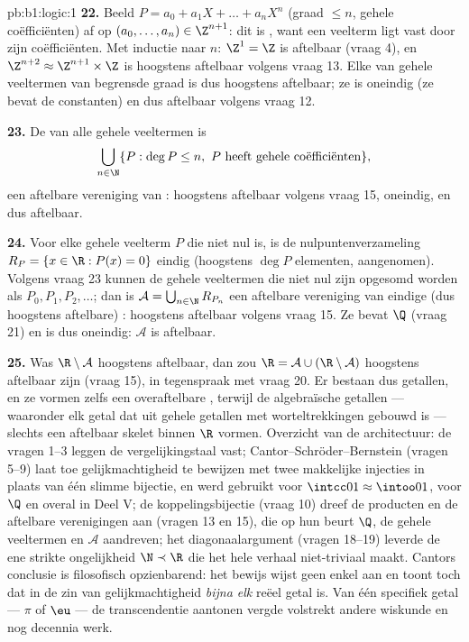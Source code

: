 \begin{solution}{pb:b1:logic:1}
\textbf{22.} Beeld $P = a_0 + a_1X + \dots + a_nX^n$ (graad $\leq n$,
gehele coëfficiënten) af op $(a_0, \dots, a_n) \in \Z^{n+1}$: dit is
, want een veelterm ligt vast door zijn coëfficiënten. Met
inductie naar $n$: $\Z^1 = \Z$ is aftelbaar (vraag 4), en $\Z^{n+2}
\approx \Z^{n+1} \times \Z$ is hoogstens aftelbaar volgens vraag 13. Elke
 van gehele veeltermen van begrensde graad is dus hoogstens
aftelbaar; ze is oneindig (ze bevat de constanten) en dus aftelbaar
volgens vraag 12.

\textbf{23.} De  van alle gehele veeltermen is
\[
\bigcup_{n \in \N} \{P : \deg P \leq n,\ P \text{ heeft gehele
coëfficiënten}\},
\]
een aftelbare vereniging van : hoogstens
aftelbaar volgens vraag 15, oneindig, en dus aftelbaar.

\textbf{24.} Voor elke gehele veelterm $P$ die niet nul is, is de
nulpuntenverzameling $R_P = \{x \in \R : P(x) = 0\}$ eindig (hoogstens
$\deg P$ elementen, aangenomen). Volgens vraag 23 kunnen de gehele
veeltermen die niet nul zijn opgesomd worden als $P_0, P_1, P_2, \dots$;
dan is $\mathcal{A} = \bigcup_{n \in \N} R_{P_n}$ een aftelbare
vereniging van eindige (dus hoogstens aftelbare) : hoogstens
aftelbaar volgens vraag 15. Ze bevat $\Q$ (vraag 21) en is dus oneindig:
$\mathcal{A}$ is aftelbaar.

\textbf{25.} Was $\R \setminus \mathcal{A}$ hoogstens aftelbaar, dan zou
$\R = \mathcal{A} \cup (\R \setminus \mathcal{A})$ hoogstens aftelbaar
zijn (vraag 15), in tegenspraak met vraag 20. Er bestaan dus
 getallen, en ze vormen zelfs een overaftelbare
, terwijl de algebraïsche getallen --- waaronder elk getal dat
uit gehele getallen met worteltrekkingen gebouwd is --- slechts een
aftelbaar skelet binnen $\R$ vormen. Overzicht van de architectuur: de
vragen 1--3 leggen de vergelijkingstaal vast;
Cantor--Schröder--Bernstein (vragen 5--9) laat toe gelijkmachtigheid te
bewijzen met twee makkelijke injecties in plaats van één slimme bijectie,
en werd gebruikt voor $\intcc01 \approx \intoo01$, voor $\Q$ en overal in
Deel V; de koppelingsbijectie (vraag 10) dreef de producten en de
aftelbare verenigingen aan (vragen 13 en 15), die op hun beurt $\Q$, de
gehele veeltermen en $\mathcal{A}$ aandreven; het diagonaalargument
(vragen 18--19) leverde de ene strikte ongelijkheid $\N \prec \R$ die het
hele verhaal niet-triviaal maakt. Cantors conclusie is filosofisch
opzienbarend: het bewijs wijst geen enkel  aan en toont
toch dat in de zin van gelijkmachtigheid \emph{bijna elk} reëel getal
 is. Van één specifiek getal --- $\pi$ of $\eu$ --- de
transcendentie aantonen vergde volstrekt andere wiskunde en nog decennia
werk.
\end{solution}

